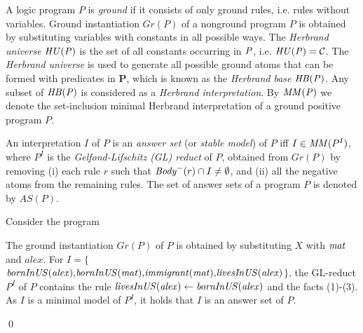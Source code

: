   



A logic program $P$ is \emph{ground} if it consists of only ground rules, i.e. rules without
variables. Ground instantiation $Gr(P)$ of a nonground program $P$ is obtained by substituting variables with constants in all possible ways. The \emph{Herbrand universe}  $\mathit{HU(P)}$ is the set of all constants occurring in $\mathit{P}$, i.e.  $\mathit{HU(P)}=\mathcal{C}$. The \emph{Herbrand universe} is used to generate all possible ground atoms that can be formed with predicates in $\mathbf{P}$, which is known as the \emph{Herbrand base} $\mathit{HB(P)}$.
Any subset of $\mathit{HB(P)}$ is considered as a \emph{Herbrand interpretation}. By $\mathit{MM(P)}$ we denote the set-inclusion minimal Herbrand interpretation of a ground positive program $P$.

An interpretation $I$ of $P$ is an \emph{answer set} (or \emph{stable model}) of $P$ iff $I \in \mathit{MM}(P^I)$, where $P^I$ is the \emph{Gelfond-Lifschitz (GL) reduct} \cite{GL1988} of $P$, obtained from $Gr(P)$ by removing (i) each rule $r$ such that $\mathit{Body}^-(r) \cap I\neq\emptyset$, and (ii) all the negative atoms from the remaining rules. The set of answer sets of a program $P$ is denoted by $AS(P)$.
%
\begin{example}
Consider the program \\
{\small {}}
            
\normalsize
{\smallskip

\noindent            
The ground instantiation $Gr(P)$ of $P$ is obtained by substituting $X$ with $\mathit{mat}$ and ${alex}$. For $I{=}\{${\small$\mathit{bornInUS(alex){,}bornInUS(mat){,}immigrant(mat){,}livesInUS(alex)}$}$\}$, the GL-reduct $P^I$ of $P$ contains the rule $\mathit{livesInUS(alex)\leftarrow bornInUS(alex)}$ and the facts (1)-(3). As $I$ is a minimal model of $P^I$, it holds that $I$ is an answer set of $P$.}\qed
\end{example}

